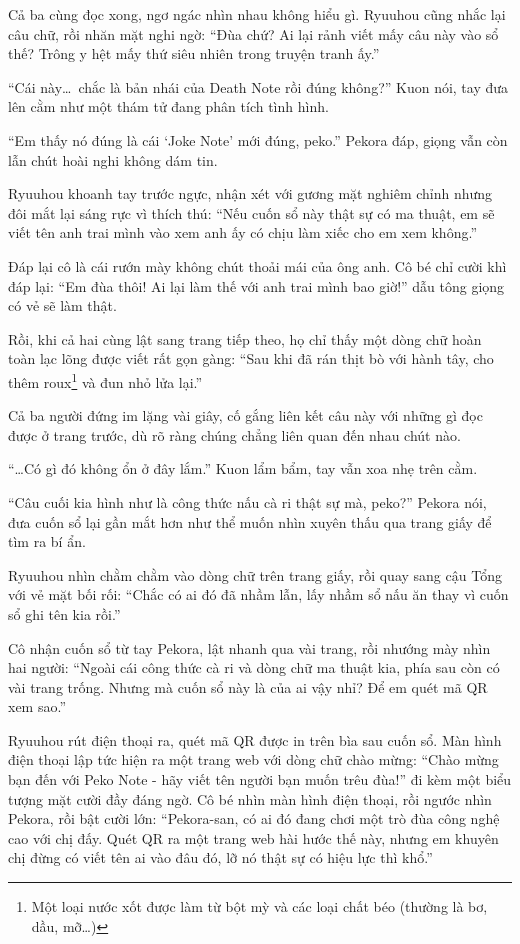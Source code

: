 \documentclass[../main.tex]{subfiles}
\begin{document}
Cả ba cùng đọc xong, ngơ ngác nhìn nhau không hiểu gì. Ryuuhou cũng nhắc lại câu chữ, rồi nhăn mặt nghi ngờ: ``Đùa chứ? Ai lại rảnh viết mấy câu này vào sổ thế? Trông y hệt mấy thứ siêu nhiên trong truyện tranh ấy.''

``Cái này\dots\ chắc là bản nhái của Death Note rồi đúng không?'' Kuon nói, tay đưa lên cằm như một thám tử đang phân tích tình hình.

``Em thấy nó đúng là cái `Joke Note' mới đúng, peko.'' Pekora đáp, giọng vẫn còn lẫn chút hoài nghi không dám tin.

Ryuuhou khoanh tay trước ngực, nhận xét với gương mặt nghiêm chỉnh nhưng đôi mắt lại sáng rực vì thích thú: ``Nếu cuốn sổ này thật sự có ma thuật, em sẽ viết tên anh trai mình vào xem anh ấy có chịu làm xiếc cho em xem không.''

Đáp lại cô là cái rướn mày không chút thoải mái của ông anh. Cô bé chỉ cười khì đáp lại: ``Em đùa thôi! Ai lại làm thế với anh trai mình bao giờ!'' dẫu tông giọng có vẻ sẽ làm thật.

Rồi, khi cả hai cùng lật sang trang tiếp theo, họ chỉ thấy một dòng chữ hoàn toàn lạc lõng được viết rất gọn gàng: ``Sau khi đã rán thịt bò với hành tây, cho thêm roux\footnote{Một loại nước xốt được làm từ bột mỳ và các loại chất béo (thường là bơ, dầu, mỡ\dots)} và đun nhỏ lửa lại.''

Cả ba người đứng im lặng vài giây, cố gắng liên kết câu này với những gì đọc được ở trang trước, dù rõ ràng chúng chẳng liên quan đến nhau chút nào.

``\dots Có gì đó không ổn ở đây lắm.'' Kuon lẩm bẩm, tay vẫn xoa nhẹ trên cằm.

``Câu cuối kia hình như là công thức nấu cà ri thật sự mà, peko?'' Pekora nói, đưa cuốn sổ lại gần mắt hơn như thể muốn nhìn xuyên thấu qua trang giấy để tìm ra bí ẩn.

Ryuuhou nhìn chằm chằm vào dòng chữ trên trang giấy, rồi quay sang cậu Tổng với vẻ mặt bối rối: ``Chắc có ai đó đã nhầm lẫn, lấy nhầm sổ nấu ăn thay vì cuốn sổ ghi tên kia rồi.''

Cô nhận cuốn sổ từ tay Pekora, lật nhanh qua vài trang, rồi nhướng mày nhìn hai người: ``Ngoài cái công thức cà ri và dòng chữ ma thuật kia, phía sau còn có vài trang trống. Nhưng mà cuốn sổ này là của ai vậy nhỉ? Để em quét mã QR xem sao.''

Ryuuhou rút điện thoại ra, quét mã QR được in trên bìa sau cuốn sổ. Màn hình điện thoại lập tức hiện ra một trang web với dòng chữ chào mừng: ``Chào mừng bạn đến với Peko Note - hãy viết tên người bạn muốn trêu đùa!'' đi kèm một biểu tượng mặt cười đầy đáng ngờ. Cô bé nhìn màn hình điện thoại, rồi ngước nhìn Pekora, rồi bật cười lớn: ``Pekora-san, có ai đó đang chơi một trò đùa công nghệ cao với chị đấy. Quét QR ra một trang web hài hước thế này, nhưng em khuyên chị đừng có viết tên ai vào đâu đó, lỡ nó thật sự có hiệu lực thì khổ.''
\end{document}
